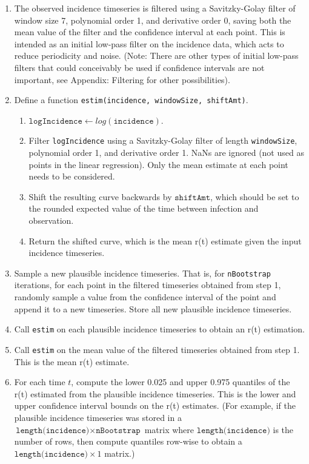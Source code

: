 \documentclass{article}
\newcommand{\code}[1]{\texttt{#1}}
\begin{document}
\begin{enumerate}
	\item The observed incidence timeseries is filtered using a Savitzky-Golay filter of window size 7, polynomial order 1, and derivative order 0, saving both the mean value of the filter and the confidence interval at each point. This is intended as an initial low-pass filter on the incidence data, which acts to reduce periodicity and noise. (Note: There are other types of initial low-pass filters that could conceivably be used if confidence intervals are not important, see Appendix: Filtering for other possibilities).
	
	\item Define a function \code{estim(incidence, windowSize, shiftAmt)}.
		\begin{enumerate}
			\item $\code{logIncidence} \gets log(\code{incidence})$.
			\item Filter \code{logIncidence} using a Savitzky-Golay filter of length \code{windowSize}, polynomial order 1, and derivative order 1. NaNs are ignored (not used as points in the linear regression). Only the mean estimate at each point needs to be considered.
			\item Shift the resulting curve backwards by $\code{shiftAmt}$, which should be set to the rounded expected value of the time between infection and observation. 
			\item Return the shifted curve, which is the mean r(t) estimate given the input incidence timeseries.
		\end{enumerate}
	
	\item Sample a new plausible incidence timeseries. That is, for \code{nBootstrap} iterations, for each point in the filtered timeseries obtained from step 1, randomly sample a value from the confidence interval of the point and append it to a new timeseries. Store all new plausible incidence timeseries.
	
	\item Call \code{estim} on each plausible incidence timeseries to obtain an r(t) estimation. 
	
	\item Call \code{estim} on the mean value of the filtered timeseries obtained from step 1. This is the mean r(t) estimate.
	
	\item For each time $t$, compute the lower 0.025 and upper 0.975 quantiles of the r(t) estimated from the plausible incidence timeseries. This is the lower and upper confidence interval bounds on the r(t) estimates. (For example, if the plausible incidence timeseries was stored in a $\code{length(incidence)} \times \code{nBootstrap}$ matrix where $\code{length(incidence)}$ is the number of rows, then compute quantiles row-wise to obtain a $\code{length(incidence)} \times 1$ matrix.) 
\end{enumerate}
\end{document}
